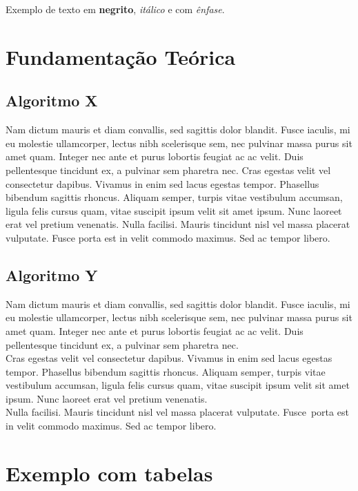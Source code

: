 \documentclass[11pt,twocolumn]{article}
\begin{document}
Exemplo de texto em \textbf{negrito}, \textit{itálico} e com \emph{ênfase}.

\section{Fundamentação Teórica}

\subsection{Algoritmo X}

Nam dictum mauris et diam convallis, sed sagittis dolor blandit. Fusce iaculis, mi eu molestie ullamcorper, lectus nibh scelerisque sem, nec pulvinar massa purus sit amet quam. Integer nec ante et purus lobortis feugiat ac ac velit. Duis pellentesque tincidunt ex, a pulvinar sem pharetra nec. Cras egestas velit vel consectetur dapibus. Vivamus in enim sed lacus egestas tempor. Phasellus bibendum sagittis rhoncus. Aliquam semper, turpis vitae vestibulum accumsan, ligula felis cursus quam, vitae suscipit ipsum velit sit amet ipsum. Nunc laoreet erat vel pretium venenatis. Nulla facilisi. Mauris tincidunt nisl vel massa placerat vulputate. Fusce porta est in velit commodo maximus. Sed ac tempor libero.

\subsection{Algoritmo Y}

Nam dictum mauris et diam convallis, sed sagittis dolor blandit. Fusce iaculis, mi eu molestie ullamcorper, lectus nibh scelerisque sem, nec pulvinar massa purus sit amet quam. Integer nec ante et purus lobortis feugiat ac ac velit. Duis pellentesque tincidunt ex, a pulvinar sem pharetra nec. \\
Cras egestas velit vel consectetur dapibus. Vivamus in enim sed lacus egestas tempor. Phasellus bibendum sagittis rhoncus. Aliquam semper, turpis vitae vestibulum accumsan, ligula felis cursus quam, vitae suscipit ipsum velit sit amet ipsum. Nunc laoreet erat vel pretium venenatis. \\
Nulla facilisi. Mauris tincidunt nisl vel massa placerat vulputate. Fusce~porta est in velit commodo maximus. Sed ac tempor libero.

\section{Exemplo com tabelas}
\end{document}
